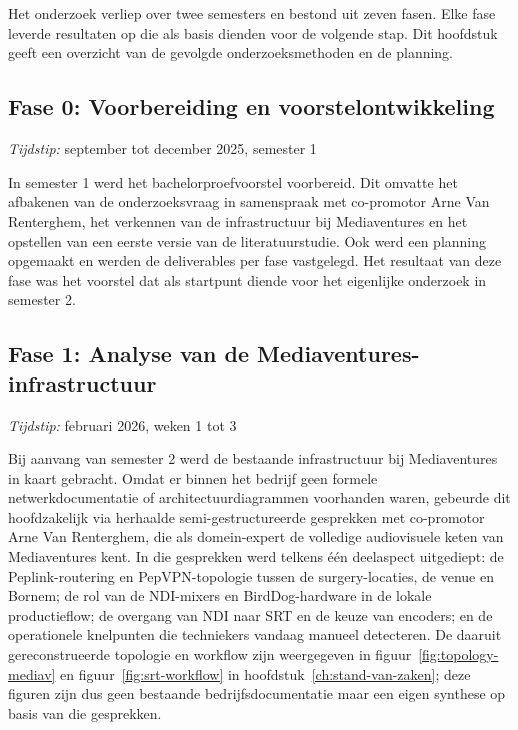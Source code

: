 
\chapter{}%
\label{ch:methodologie}

Het onderzoek verliep over twee semesters en bestond uit zeven fasen. Elke fase leverde resultaten op die als basis dienden voor de volgende stap. Dit hoofdstuk geeft een overzicht van de gevolgde onderzoeksmethoden en de planning.

\section{Fase 0: Voorbereiding en voorstelontwikkeling}
\label{sec:fase0}

\emph{Tijdstip:} september tot december 2025, semester 1

In semester 1 werd het bachelorproefvoorstel voorbereid. Dit omvatte het afbakenen van de onderzoeksvraag in samenspraak met co-promotor Arne Van Renterghem, het verkennen van de infrastructuur bij Mediaventures en het opstellen van een eerste versie van de literatuurstudie. Ook werd een planning opgemaakt en werden de deliverables per fase vastgelegd. Het resultaat van deze fase was het voorstel dat als startpunt diende voor het eigenlijke onderzoek in semester 2.

\section{Fase 1: Analyse van de Mediaventures-infrastructuur}
\label{sec:fase1}

\emph{Tijdstip:} februari 2026, weken 1 tot 3

Bij aanvang van semester 2 werd de bestaande infrastructuur bij Mediaventures in kaart gebracht. Omdat er binnen het bedrijf geen formele netwerkdocumentatie of architectuurdiagrammen voorhanden waren, gebeurde dit hoofdzakelijk via herhaalde semi-gestructureerde gesprekken met co-promotor Arne Van Renterghem, die als domein-expert de volledige audiovisuele keten van Mediaventures kent. In die gesprekken werd telkens één deelaspect uitgediept: de Peplink-routering en PepVPN-topologie tussen de surgery-locaties, de venue en Bornem; de rol van de NDI-mixers en BirdDog-hardware in de lokale productieflow; de overgang van NDI naar SRT en de keuze van encoders; en de operationele knelpunten die techniekers vandaag manueel detecteren. De daaruit gereconstrueerde topologie en workflow zijn weergegeven in figuur~\ref{fig:topology-mediav} en figuur~\ref{fig:srt-workflow} in hoofdstuk~\ref{ch:stand-van-zaken}; deze figuren zijn dus geen bestaande bedrijfsdocumentatie maar een eigen synthese op basis van die gesprekken.

